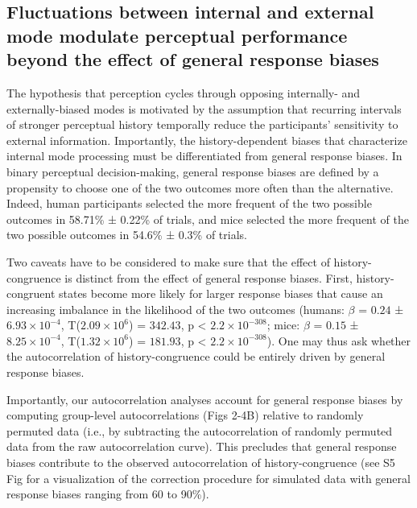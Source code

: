 \documentclass[
]{article}
\begin{document}
\hypertarget{fluctuations-between-internal-and-external-mode-modulate-perceptual-performance-beyond-the-effect-of-general-response-biases}{%
\subsection{Fluctuations between internal and external mode modulate
perceptual performance beyond the effect of general response
biases}\label{fluctuations-between-internal-and-external-mode-modulate-perceptual-performance-beyond-the-effect-of-general-response-biases}}

The hypothesis that perception cycles through opposing internally- and
externally-biased modes is motivated by the assumption that recurring
intervals of stronger perceptual history temporally reduce the
participants' sensitivity to external information. Importantly, the
history-dependent biases that characterize internal mode processing must
be differentiated from general response biases. In binary perceptual
decision-making, general response biases are defined by a propensity to
choose one of the two outcomes more often than the alternative. Indeed,
human participants selected the more frequent of the two possible
outcomes in 58.71\% ± 0.22\% of trials, and mice selected the more
frequent of the two possible outcomes in 54.6\% ± 0.3\% of trials.

Two caveats have to be considered to make sure that the effect of
history-congruence is distinct from the effect of general response
biases. First, history-congruent states become more likely for larger
response biases that cause an increasing imbalance in the likelihood of
the two outcomes (humans: \(\beta\) = \(0.24\) ±
\(\ensuremath{6.93\times 10^{-4}}\),
T(\(\ensuremath{2.09\times 10^{6}}\)) = \(342.43\), p < \(\ensuremath{2.2\times 10^{-308}}\); mice:
\(\beta\) = \(0.15\) ± \(\ensuremath{8.25\times 10^{-4}}\),
T(\(\ensuremath{1.32\times 10^{6}}\)) = \(181.93\), p < \(\ensuremath{2.2\times 10^{-308}}\)). One may
thus ask whether the autocorrelation of history-congruence could be
entirely driven by general response biases.

Importantly, our autocorrelation analyses account for general response
biases by computing group-level autocorrelations (Figs 2-4B) relative
to randomly permuted data (i.e., by subtracting the autocorrelation of
randomly permuted data from the raw autocorrelation curve). This
precludes that general response biases contribute to the observed
autocorrelation of history-congruence (see S5 Fig for a
visualization of the correction procedure for simulated data with
general response biases ranging from 60 to 90\%).
\end{document}
